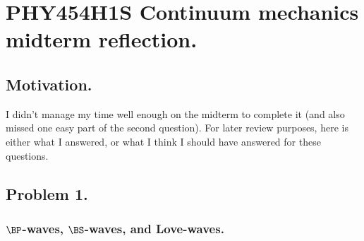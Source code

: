 
%

\chapter{PHY454H1S Continuum mechanics midterm reflection.}
\label{chap:continuumMidtermReflection}
{}
\date{Mar 14, 2012}

\beginArtWithToc

\section{Motivation.}

I didn't manage my time well enough on the midterm to complete it (and also missed one easy part of the second question).  For later review purposes, here is either what I answered, or what I think I should have answered for these questions.

\section{Problem 1.}

\subsection{$\BP$-waves, $\BS$-waves, and Love-waves.}

